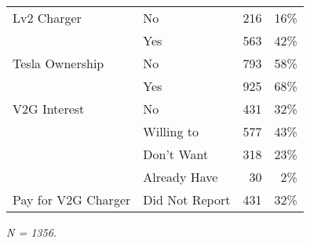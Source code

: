 \begin{table}[H]
\begin{threeparttable}
\begin{tabular}[t]{llrr}
\multirow{-2}{*}{\raggedright\arraybackslash Lv2 Charger} & No & 216 & 16\%\\
\cmidrule(lr){1-4}
 & Yes & 563 & 42\%\\

\multirow{-2}{*}{\raggedright\arraybackslash Tesla Ownership} & No & 793 & 58\%\\
\cmidrule(lr){1-4}
 & Yes & 925 & 68\%\\

\multirow{-2}{*}{\raggedright\arraybackslash V2G Interest} & No & 431 & 32\%\\
\cmidrule(lr){1-4}
 & Willing to & 577 & 43\%\\

 & Don't Want & 318 & 23\%\\

 & Already Have & 30 & 2\%\\

\multirow{-4}{*}{\raggedright\arraybackslash Pay for V2G Charger} & Did Not Report & 431 & 32\%\\
\bottomrule
\end{tabular}
\begin{tablenotes}
\small
\item [] \textit{N = 1356.}
\end{tablenotes}
\label{table_vehicles}
\end{threeparttable}
\end{table}